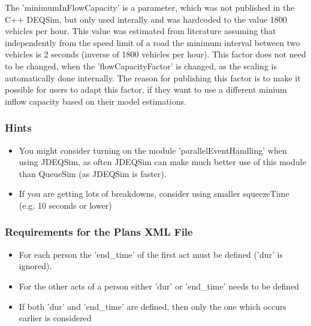 The 'minimumInFlowCapacity' is a  parameter, which was not published in the C++ DEQSim, but only used  interally and was hardcoded to the value 1800 vehicles per hour. This  value was estimated from literature assuming that independently from the  speed limit of a road the minimum interval between two vehicles is 2  seconds (inverse of 1800 vehicles per hour). This factor does not need  to be changed, when the 'flowCapacityFactor' is changed, as the scaling  is automatically done internally. The reason for publishing this factor  is to make it possible for users to adapt this factor, if they want to  use a different minium inflow capacity based on their model estimations.

\subsubsection{Hints}
\begin{itemize}
	\item You might consider turning on the module  'parallelEventHandling' when using JDEQSim, as often JDEQSim can make  much better use of this module than QueueSim (as JDEQSim is faster).
	\item If you are getting lots of breakdowns, consider using smaller squeezeTime (e.g. 10 seconds or lower)
\end{itemize}

\subsubsection{Requirements for the Plans XML File}

\begin{itemize}
	\item For each person the 'end\_time' of the first act must be defined ('dur' is ignored).
	\item For the other acts of a person either 'dur' or 'end\_time' needs to be defined
	\item If both 'dur' and 'end\_time' are defined, then only the one which occurs earlier is considered
\end{itemize}


